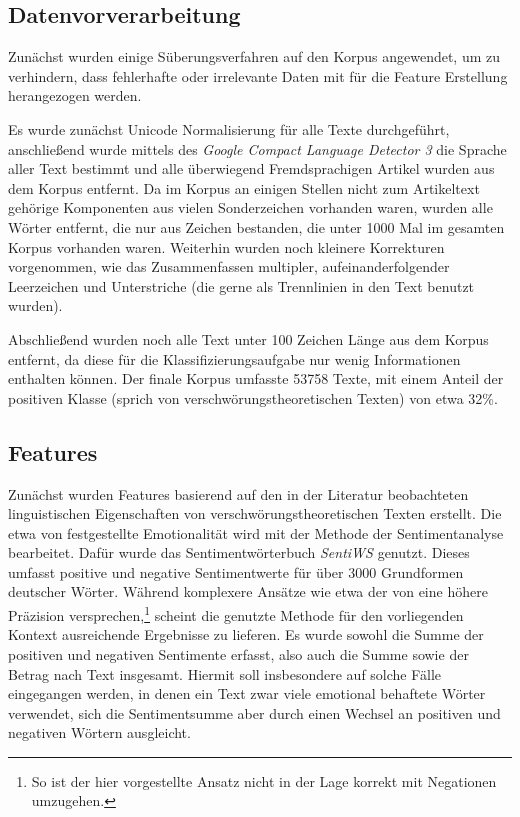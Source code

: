 \subsection{Datenvorverarbeitung}

Zunächst wurden einige Süberungsverfahren auf den Korpus angewendet, um zu verhindern, dass fehlerhafte oder irrelevante Daten mit für die Feature Erstellung herangezogen werden.

Es wurde zunächst Unicode Normalisierung für alle Texte durchgeführt, anschließend wurde mittels des \textit{Google Compact Language Detector 3} \parencite[][]{cld3} die Sprache aller Text bestimmt und alle überwiegend Fremdsprachigen Artikel wurden aus dem Korpus entfernt.
Da im Korpus an einigen Stellen nicht zum Artikeltext gehörige Komponenten aus vielen Sonderzeichen vorhanden waren, wurden alle Wörter entfernt, die nur aus Zeichen bestanden, die unter 1000 Mal im gesamten Korpus vorhanden waren.
Weiterhin wurden noch kleinere Korrekturen vorgenommen, wie das Zusammenfassen multipler, aufeinanderfolgender Leerzeichen und Unterstriche (die gerne als Trennlinien in den Text benutzt wurden).

Abschließend wurden noch alle Text unter 100 Zeichen Länge aus dem Korpus entfernt, da diese für die Klassifizierungsaufgabe nur wenig Informationen enthalten können. Der finale Korpus umfasste 53758 Texte, mit einem Anteil der positiven Klasse (sprich von verschwörungstheoretischen Texten) von etwa 32\%.

\subsection{Features}

Zunächst wurden Features basierend auf den in der Literatur beobachteten linguistischen Eigenschaften von verschwörungstheoretischen Texten erstellt.
Die etwa von \textcite*[10]{miller_2002} festgestellte Emotionalität wird mit der Methode der Sentimentanalyse bearbeitet.
Dafür wurde das Sentimentwörterbuch \textit{SentiWS} \parencite[][]{sentiws} genutzt.
Dieses umfasst positive und negative Sentimentwerte für über 3000 Grundformen deutscher Wörter.
Während komplexere Ansätze wie etwa der von \textcite[]{ml_sentiment} eine höhere Präzision versprechen,\footnote{So ist der hier vorgestellte Ansatz nicht in der Lage korrekt mit Negationen umzugehen.} scheint die genutzte Methode für den vorliegenden Kontext ausreichende Ergebnisse zu lieferen.
Es wurde sowohl die Summe der positiven und negativen Sentimente erfasst, also auch die Summe sowie der Betrag nach Text insgesamt.
Hiermit soll insbesondere auf solche Fälle eingegangen werden, in denen ein Text zwar viele emotional behaftete Wörter verwendet, sich die Sentimentsumme aber durch einen Wechsel an positiven und negativen Wörtern ausgleicht.

